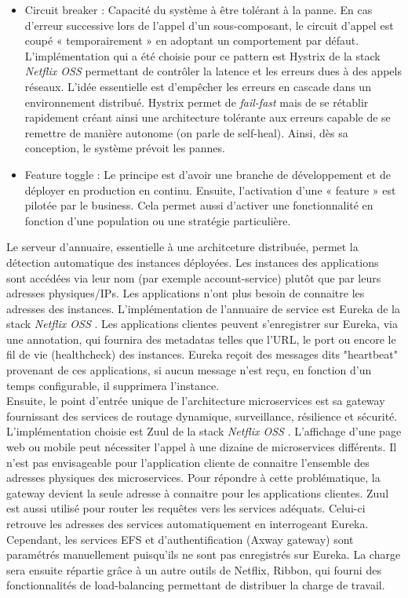 \begin{itemize}
	\item Circuit breaker : Capacité du système à être tolérant à la panne. En cas d’erreur successive lors de l’appel d’un sous-composant, le circuit d’appel est coupé « temporairement » en adoptant un comportement par défaut. L'implémentation qui a été choisie pour ce pattern est Hystrix de la stack \textit{Netflix OSS} \cite{bib_hystrix} permettant de contrôler la latence et les erreurs dues à des appels réseaux. L'idée essentielle est d'empêcher les erreurs en cascade dans un environnement distribué. Hystrix permet de \textit{fail-fast} mais de se rétablir rapidement créant ainsi une architecture tolérante aux erreurs capable de se remettre de manière autonome (on parle de self-heal). Ainsi, dès sa conception, le système prévoit les pannes.
	\item Feature toggle : Le principe est d’avoir une branche de développement et de déployer en production en continu. Ensuite, l’activation d’une « feature » est pilotée par le business. Cela permet aussi d’activer une fonctionnalité en fonction d’une population ou une stratégie particulière. \\
\end{itemize}

	Le serveur d'annuaire, essentielle à une architceture distribuée, permet la détection automatique des instances déployées. Les instances des applications sont accédées via leur nom (par exemple account-service) plutôt que par leurs adresses physiques/IPs. Les applications n'ont plus besoin de connaitre les adresses des instances. L'implémentation de l'annuaire de service est Eureka de la stack \textit{Netflix OSS} \cite{bib_eureka}. Les applications clientes peuvent s'enregistrer sur Eureka, via une annotation, qui fournira des metadatas telles que l'URL, le port ou encore le fil de vie (healthcheck) des instances. Eureka reçoit des messages dits "heartbeat" provenant de ces applications, si aucun message n'est reçu, en fonction d'un temps configurable, il supprimera l'instance. \\

	Ensuite, le point d'entrée unique de l'architecture microservices est sa gateway fournissant des services de routage dynamique, surveillance, résilience et sécurité. L'implémentation choisie est Zuul de la stack \textit{Netflix OSS} \cite{bib_zuul}. L'affichage d'une page web ou mobile peut nécessiter l'appel à une dizaine de microservices différents. Il n'est pas envisageable pour l'application cliente de connaitre l'ensemble des adresses physiques des microservices. Pour répondre à cette problématique, la gateway devient la seule adresse à connaitre pour les applications clientes. Zuul est aussi utilisé pour router les requêtes vers les services adéquats. Celui-ci retrouve les adresses des services automatiquement en interrogeant Eureka. Cependant, les services EFS et d'authentification (Axway gateway) sont paramétrés manuellement puisqu'ils ne sont pas enregistrés sur Eureka. La charge sera ensuite répartie grâce à un autre outils de Netflix, Ribbon, qui fourni des fonctionnalités de load-balancing permettant de distribuer la charge de travail. \\